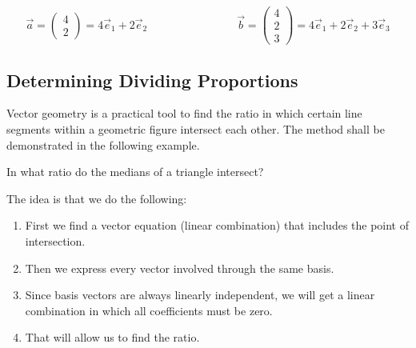 \documentclass[12pt,eng]{skript_ogg}
\begin{document}
\[\vec{a}=\begin{pmatrix}4\\2
\end{pmatrix}=4\vec{e}_1+2\vec{e}_2\qquad\qquad\qquad\qquad\vec{b}=\begin{pmatrix}4\\2\\3
\end{pmatrix}=4\vec{e}_1+2\vec{e}_2+3\vec{e}_3\]

\subsection{Determining Dividing Proportions}
Vector geometry is a practical tool to find the ratio in which certain line segments within a geometric figure intersect each other. The method shall be demonstrated in the following example.

In what ratio do the medians of a triangle intersect?

\parbox[T]{7cm}{}\parbox[T]{9.5cm}{The idea is that we do the following:
\begin{enumerate}
\setlength{\itemsep}{-1ex}
	\item First we find a vector equation (linear combination) that includes the point of intersection.
	\item Then we express every vector involved through the same basis.
	\item Since basis vectors are always linearly independent, we will get a linear combination in which all coefficients must be zero.
	\item That will allow us to find the ratio.
\end{enumerate}}
\end{document}
